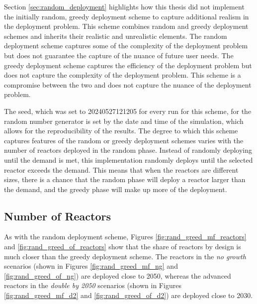 Section \ref{sec:random_deployment} highlights how this thesis did not implement the initially random, greedy deployment scheme to capture additional realism in the deployment problem. This scheme combines random and greedy deployment schemes and inherits their realistic and unrealistic elements. The random deployment scheme captures some of the complexity of the deployment problem but does not guarantee the capture of the nuance of future user needs. The greedy deployment scheme captures the efficiency of the deployment problem but does not capture the complexity of the deployment problem. This scheme is a compromise between the two and does not capture the nuance of the deployment problem.

The seed, which was set to 20240527121205 for every run for this scheme, for
the random number generator is set by the date and time of the simulation,
which allows for the reproducibility of the results. The degree to which this
scheme captures features of the random or greedy deployment schemes varies with
the number of reactors deployed in the random phase. Instead of randomly
deploying until the demand is met, this implementation randomly deploys until
the selected reactor exceeds the demand. This means that when the reactors are
different sizes, there is a chance that the random phase will deploy a reactor
larger than the demand, and the greedy phase will make up more of
the deployment.


\subsection{Number of Reactors}
\label{sec:rand_greed_reactors}

As with the random deployment scheme, Figures
\ref{fig:rand_greed_mf_reactors} and \ref{fig:rand_greed_of_reactors} show that the share of reactors by design is much closer than the greedy deployment scheme. The reactors in the \textit{no growth} scenarios (shown in Figures \ref{fig:rand_greed_mf_ng} and \ref{fig:rand_greed_of_ng}) are deployed close to 2050, whereas the advanced reactors in the \textit{double by 2050} scenarios (shown in Figures \ref{fig:rand_greed_mf_d2} and \ref{fig:rand_greed_of_d2}) are deployed close to 2030.

